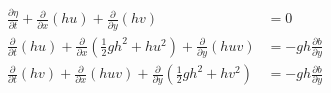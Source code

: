 \begin{align}
  \begin{split}
    \frac{\partial \eta}{\partial t} + \frac{\partial}{\partial x}(hu) + \frac{\partial}{\partial y}(hv) &= 0 \\
    \frac{\partial }{\partial t}(hu) + \frac{\partial}{\partial x}\left(\frac{1}{2}gh^2+hu^2 \right) + \frac{\partial}{\partial y}( huv ) &= -gh\frac{\partial b}{\partial y} \\
    \frac{\partial}{\partial t}( hv)+ \frac{\partial}{\partial x}( huv ) + \frac{\partial}{\partial y}\left(\frac{1}{2}gh^2+hv^2 \right) &=  -gh\frac{\partial b}{\partial y}  \\
  \end{split}
\end{align}




